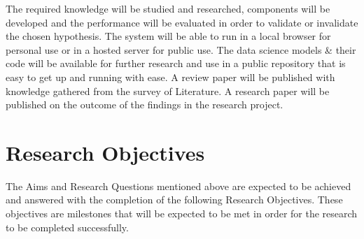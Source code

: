 \documentclass[a4paper, 12pt, oneside]{report}
\begin{document}
The required knowledge will be studied and researched, components will be developed and the performance will be evaluated in order to validate or invalidate the chosen hypothesis. The system will be able to run in a local browser for personal use or in a hosted server for public use. The data science models \& their code will be available for further research and use in a public repository that is easy to get up and running with ease. A review paper will be published with knowledge gathered from the survey of Literature. A research paper will be published on the outcome of the findings in the research project.

\chapter{Research Objectives}
The Aims and Research Questions mentioned above are expected to be achieved and answered with the completion of the following Research Objectives. These objectives are milestones that will be expected to be met in order for the research to be completed successfully.

\end{document}
